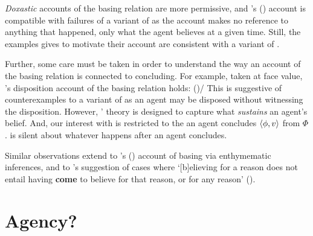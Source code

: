 \begin{note}
{    \emph{Doxastic} accounts of the basing relation are more permissive, and \citeauthor{Tolliver:1982us}'s (\citeyear{Tolliver:1982us}) account is compatible with failures of a variant of \issueInclusion{} as the account makes no reference to anything that happened, only what the agent believes at a given time.
    Still, the examples \citeauthor{Tolliver:1982us} gives to motivate their account are consistent with a variant of \issueInclusion{}.

    Further, some care must be taken in order to understand the way an account of the basing relation is connected to concluding.
    For example, taken at face value, \citeauthor{Evans:2013tw}'s disposition account of the basing relation holds:
     (\citeyear[2952]{Evans:2013tw})/
  This is suggestive of counterexamples to a variant of \issueInclusion{} as an agent may be disposed without witnessing the disposition.
  However, \citeauthor{Evans:2013tw}' theory is designed to capture what \emph{sustains} an agent's belief.%
  And, our interest with \issueInclusion{} is restricted to the  an agent concludes \(\langle\phi, v\rangle\) from \(\Phi\).
  \issueInclusion{} is silent about whatever happens after an agent concludes.

  Similar observations extend to \citeauthor{Moretti:2019wx}'s (\citeyear{Moretti:2019wx}) account of basing via enthymematic inferences, and to  \citeauthor{Audi:1986to}'s suggestion of cases where `[b]elieving for a reason does not entail having \textbf{come} to believe for that reason, or for any reason' (\citeyear[32--33]{Audi:1986to}).
  }
\end{note}


\section{Agency?}
\label{sec:agency}

